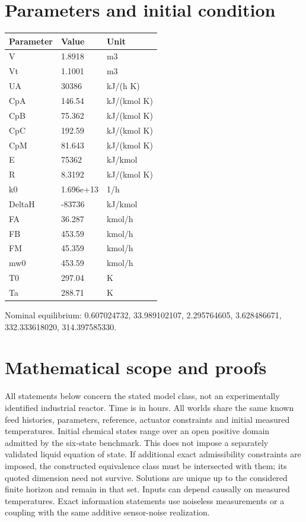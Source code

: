 \documentclass[
  11pt,
]{article}
\begin{document}
\hypertarget{parameters-and-initial-condition}{%
\section{Parameters and initial
condition}\label{parameters-and-initial-condition}}

\begingroup\footnotesize

\begin{longtable}[]{@{}lll@{}}
\toprule\noalign{}
Parameter & Value & Unit \\
\midrule\noalign{}
\endhead
\bottomrule\noalign{}
\endlastfoot
V & 1.8918 & m3 \\
Vt & 1.1001 & m3 \\
UA & 30386 & kJ/(h K) \\
CpA & 146.54 & kJ/(kmol K) \\
CpB & 75.362 & kJ/(kmol K) \\
CpC & 192.59 & kJ/(kmol K) \\
CpM & 81.643 & kJ/(kmol K) \\
E & 75362 & kJ/kmol \\
R & 8.3192 & kJ/(kmol K) \\
k0 & 1.696e+13 & 1/h \\
DeltaH & -83736 & kJ/kmol \\
FA & 36.287 & kmol/h \\
FB & 453.59 & kmol/h \\
FM & 45.359 & kmol/h \\
mw0 & 453.59 & kmol/h \\
T0 & 297.04 & K \\
Ta & 288.71 & K \\
\end{longtable}

\endgroup

Nominal equilibrium: 0.607024732, 33.989102107, 2.295764605,
3.628486671, 332.333618020, 314.397585330.

\hypertarget{mathematical-scope-and-proofs}{%
\section{Mathematical scope and
proofs}\label{mathematical-scope-and-proofs}}

All statements below concern the stated model class, not an
experimentally identified industrial reactor. Time is in hours. All
worlds share the same known feed histories, parameters, reference,
actuator constraints and initial measured temperatures. Initial chemical
states range over an open positive domain admitted by the six-state
benchmark. This does not impose a separately validated liquid equation
of state. If additional exact admissibility constraints are imposed, the
constructed equivalence class must be intersected with them; its quoted
dimension need not survive. Solutions are unique up to the considered
finite horizon and remain in that set. Inputs can depend causally on
measured temperatures. Exact information statements use noiseless
measurements or a coupling with the same additive sensor-noise
realization.
\end{document}
